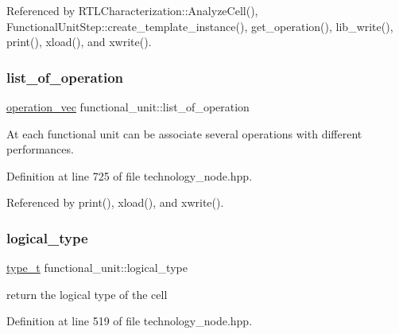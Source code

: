 Referenced by R\+T\+L\+Characterization\+::\+Analyze\+Cell(), Functional\+Unit\+Step\+::create\+\_\+template\+\_\+instance(), get\+\_\+operation(), lib\+\_\+write(), print(), xload(), and xwrite().

\mbox{\label{structfunctional__unit_a03e0801214eecf226f3a24d6e294dc8e}} 
\subsubsection{\texorpdfstring{list\+\_\+of\+\_\+operation}{list\_of\_operation}}
{\footnotesize\ttfamily \hyperlink{structfunctional__unit_a95afca234ddcc2e13d56d6e5eb53557a}{operation\+\_\+vec} functional\+\_\+unit\+::list\+\_\+of\+\_\+operation\hspace{0.3cm}{\ttfamily [private]}}



At each functional unit can be associate several operations with different performances. 



Definition at line 725 of file technology\+\_\+node.\+hpp.



Referenced by print(), xload(), and xwrite().

\mbox{\label{structfunctional__unit_a53abe80d027ef571d2e49d3a38a2c336}} 
\subsubsection{\texorpdfstring{logical\+\_\+type}{logical\_type}}
{\footnotesize\ttfamily \hyperlink{structfunctional__unit_abf715beb1f09a03995234a68c1478bfe}{type\+\_\+t} functional\+\_\+unit\+::logical\+\_\+type}



return the logical type of the cell 



Definition at line 519 of file technology\+\_\+node.\+hpp.




